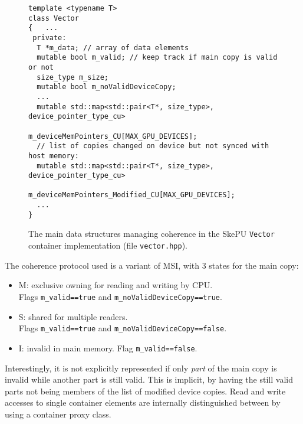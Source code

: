 \begin{figure}
\begin{small}
\begin{verbatim}
template <typename T>
class Vector
{   ...
 private:
  T *m_data; // array of data elements
  mutable bool m_valid; // keep track if main copy is valid or not
  size_type m_size;
  mutable bool m_noValidDeviceCopy;
  ...
  mutable std::map<std::pair<T*, size_type>, device_pointer_type_cu>
                             m_deviceMemPointers_CU[MAX_GPU_DEVICES];
  // list of copies changed on device but not synced with host memory:
  mutable std::map<std::pair<T*, size_type>, device_pointer_type_cu>
                    m_deviceMemPointers_Modified_CU[MAX_GPU_DEVICES];
  ...
}
\end{verbatim}
\end{small}

\vspace{-3mm}
\caption{\label{fig:skepucoherence1}The main data structures managing
  coherence in the SkePU \texttt{Vector} container implementation (file 
   \texttt{vector.hpp}).}
\end{figure}

The coherence protocol used is a variant of MSI, with 3 states for the main copy:
\begin{itemize}
\item M: exclusive owning for reading and writing by CPU.\\
         Flags \verb+m_valid==true+ and \verb+m_noValidDeviceCopy==true+.
\item S: shared for multiple readers.\\
         Flags \verb+m_valid==true+ and 
               \verb+m_noValidDeviceCopy==false+.
\item I: invalid in main memory.  Flag \verb+m_valid==false+.
\end{itemize}

Interestingly, it is not explicitly represented if only \emph{part} of 
the main copy is invalid while another part is still valid. 
This is implicit, by having the still valid parts not
being members of the list of modified device copies.
Read and write accesses to single container elements 
are internally distinguished between
by using a container proxy class.


